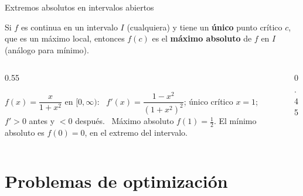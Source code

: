 \documentclass[10pt,aspectratio=169]{beamer}
\begin{document}
\begin{frame}{Extremos absolutos en intervalos abiertos}
  \begin{teorema}
    Si $f$ es continua en un intervalo $I$ (cualquiera) y tiene un \textbf{único} punto crítico $c$, que es un máximo local, entonces $f(c)$
    es el \textbf{máximo absoluto} de $f$ en $I$ (análogo para mínimo).
  \end{teorema}
  \begin{columns}
    \begin{column}{0.55\textwidth}
      \begin{ejemplo}[3]
        $f(x)=\dfrac{x}{1+x^2}$ en $[0,\infty)$: \ $f'(x)=\dfrac{1-x^2}{(1+x^2)^2}$; único crítico $x=1$; $f'>0$ antes y $<0$ después.
        \ Máximo absoluto $f(1)=\frac12$. El mínimo absoluto es $f(0)=0$, en el extremo del intervalo.
      \end{ejemplo}
    \end{column}
    \begin{column}{0.45\textwidth}
      \centering
    \end{column}
  \end{columns}
\end{frame}

\section{Problemas de optimización}
\end{document}
